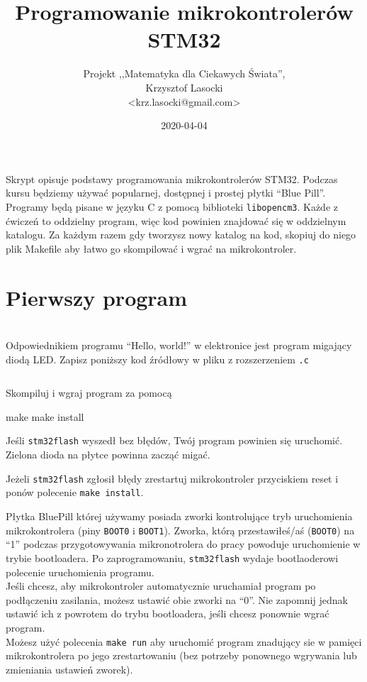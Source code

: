 \documentclass{pdfBooklets}
\title{Programowanie mikrokontrolerów STM32}
\author{%
	Projekt ,,Matematyka dla Ciekawych Świata'',\\
	Krzysztof Lasocki\\\normalsize\ttfamily <krz.lasocki@gmail.com>
}
\date  {2020-04-04}
\begin{document}
\maketitle


Skrypt opisuje podstawy programowania mikrokontrolerów STM32. Podczas kursu będziemy używać
popularnej, dostępnej i prostej płytki ``Blue Pill''. Programy będą pisane w języku
C z pomocą biblioteki \Verb$libopencm3$. Każde z ćwiczeń to oddzielny program, więc kod powinien znajdować się
w oddzielnym katalogu. Za każdym razem gdy tworzysz nowy katalog na kod, skopiuj do niego plik Makefile aby łatwo
go skompilować i wgrać na mikrokontroler.



\section{Pierwszy program}
\\
Odpowiednikiem programu ``Hello, world!'' w elektronice jest program migający diodą LED. Zapisz poniższy kod źródłowy w pliku z
rozszerzeniem \Verb$.c$

\inputminted[frame=single,firstline=6]{c}{stm32-examples/00_blink/main.c}

Skompiluj i wgraj program za pomocą

\begin{CodeFrame*}[bash]{}
make
make install
\end{CodeFrame*}

Jeśli \Verb$stm32flash$ wyszedł bez błędów, Twój program powinien się uruchomić. Zielona dioda na płytce powinna zacząć migać.

Jeżeli \Verb$stm32flash$ zgłosił błędy zrestartuj mikrokontroler przyciskiem reset i ponów polecenie \Verb$make install$.

\begin{ProTip}{}
  Płytka BluePill której używamy posiada zworki kontrolujące tryb uruchomienia mikrokontrolera (piny \Verb$BOOT0$ i \Verb$BOOT1$).
  Zworka, którą przestawiłeś/aś (\Verb$BOOT0$) na ``1'' podczas przygotowywania mikronotrolera do pracy powoduje uruchomienie w
  trybie bootloadera. Po zaprogramowaniu, \Verb$stm32flash$ wydaje bootlaoderowi polecenie uruchomienia programu.\\
  
  Jeśli chcesz, aby mikrokontroler automatycznie uruchamiał program po podłączeniu zasilania, możesz ustawić obie zworki na ``0''. Nie zapomnij
  jednak ustawić ich z powrotem do trybu bootloadera, jeśli chcesz ponownie wgrać program.\\
  
  Możesz użyć polecenia \Verb$make run$ aby uruchomić program znadujący sie w pamięci mikrokontrolera po jego zrestartowaniu (bez potrzeby ponownego wgrywania lub zmieniania ustawień zworek).
\end{ProTip}
\end{document}
